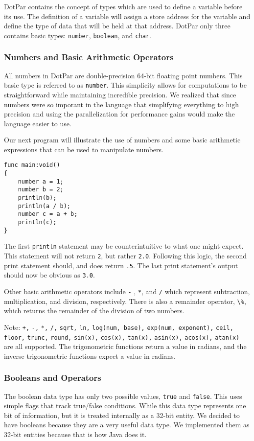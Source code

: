 \documentclass{article}
\begin{document}
DotPar contains the concept of types which are used to define a variable before its use.  The definition of a variable will assign a store address for the variable and define the type of data that will be held at that address.  DotPar only three contains basic types: \verb=number=, \verb=boolean=, and \verb=char=.

\subsubsection{Numbers and Basic Arithmetic Operators}
All numbers in DotPar are double-precision 64-bit floating point numbers.  This basic type is referred to as \verb=number=.  This simplicity allows for computations to be straightforward while maintaining incredible precision. We realized that since numbers were so imporant in the language that simplifying everything to high precision and using the parallelization for performance gains would make the language easier to use.

Our next program will illustrate the use of numbers and some basic arithmetic expressions that can be used to manipulate numbers.

\begin{verbatim}
func main:void()
{
    number a = 1;
    number b = 2;
    println(b);
    println(a / b);
    number c = a + b;
    println(c);
}
\end{verbatim}

The first \verb=println= statement may be counterintuitive to what one might expect.  This statement will not return \verb=2=, but rather \verb=2.0=.  Following this logic, the second print statement should, and does return \verb=.5=.  The last print statement's output should now be obvious as \verb=3.0=.

Other basic arithmetic operators include \verb=-= , \verb=*=, and \verb=/= which represent subtraction, multiplication, and division, respectively.  There is also a remainder operator, \verb=\%=,  which returns the remainder of the division of two numbers.

Note: \verb=+,= \verb=-,= \verb=*,= \verb=/,= \verb=sqrt,= \verb=ln,= \verb=log(num, base),= \verb=exp(num, exponent),= \verb=ceil,= \verb=floor,= \verb=trunc,= \verb=round,= \verb=sin(x),= \verb=cos(x),= \verb=tan(x),= \verb=asin(x),= \verb=acos(x),= \verb=atan(x)= are all supported. The trigonometric functions return a value in radians, and the inverse trigonometric functions expect a value in radians.

\subsubsection{Booleans and Operators}
The boolean data type has only two possible values, \verb=true= and \verb=false=.  This uses simple flags that track true/false conditions. While this data type represents one bit of information, but it is treated internally as a 32-bit entity. We decided to have booleans because they are a very useful data type. We implemented them as 32-bit entities because that is how Java does it.
\end{document}
